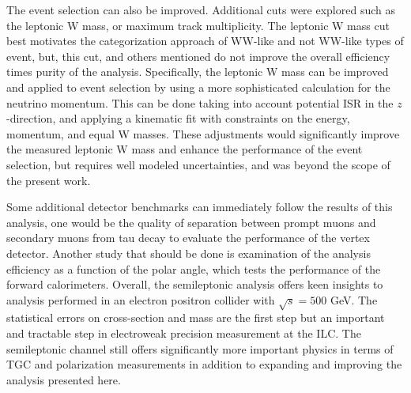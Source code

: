 The event selection can also be improved. Additional cuts were explored such as the leptonic W mass, or maximum track multiplicity. The leptonic W mass cut best motivates the categorization approach of WW-like and not WW-like types of event, but, this cut, and others mentioned do not improve the overall efficiency times purity of the analysis.  Specifically, the leptonic W mass can be improved and applied to event selection by using a more sophisticated calculation for the neutrino momentum. This can be done taking into account potential ISR in the $z$-direction, and applying a kinematic fit with constraints on the energy, momentum, and equal W masses. These adjustments would significantly improve the measured leptonic W mass and enhance the performance of the event selection, but requires well modeled uncertainties, and was beyond the scope of the present work. 
 
Some additional detector benchmarks can immediately follow the results of this analysis, one would be the quality of separation between prompt muons and secondary muons from tau decay to evaluate the performance of the vertex detector. Another study that should be done is examination of the analysis efficiency as a function of the polar angle, which tests the performance of the forward calorimeters.  Overall, the semileptonic analysis offers keen insights to analysis performed in an electron positron collider with $\sqrt{s} = 500$ GeV. The statistical errors on cross-section and mass are the first step but an important and tractable step in electroweak precision measurement at the ILC.  The semileptonic channel still offers significantly more important physics in terms of TGC and polarization measurements in addition to expanding and improving the analysis presented here. 